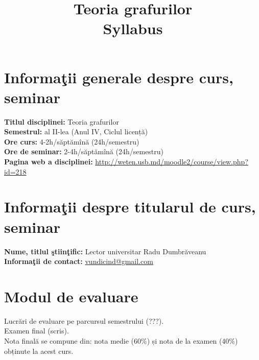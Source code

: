 

\title{Teoria grafurilor\\{\small Syllabus}}



\maketitle

\section{Informaţii generale despre curs, seminar}

{\bf Titlul disciplinei:} Teoria grafurilor\\
{\bf Semestrul:} al II-lea (Anul IV, Ciclul licență)\\
{\bf Ore curs:} 4-2h/săptămînă (24h/semestru)\\
{\bf Ore de seminar:} 2-4h/săptămînă (24h/semestru)\\
{\bf Pagina web a disciplinei:} \url{http://weten.usb.md/moodle2/course/view.php?id=218}

\section{Informaţii despre titularul de curs, seminar}

{\bf Nume, titlul ştiinţific:} Lector universitar Radu Dumbrăveanu\\
{\bf Informaţii de contact:} \url{vundicind@gmail.com}



\section{Modul de evaluare}
Lucrări de evaluare pe parcursul semestrului (???).\\
Examen final (scris).\\
Nota finală se compune din: nota medie (60\%) și nota de la examen (40\%) obținute la acest curs.


